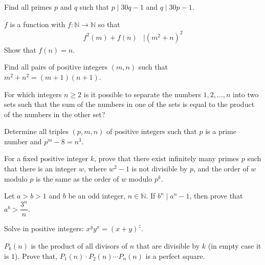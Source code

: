 \begin{problem}
	Find all primes $p$ and $q$ such that $p \mid  30q-1$ and $q \mid  30p-1$.
\end{problem}

\begin{problem}
	$f$ is a function with $f:\mathbb{N}\to\mathbb{N} $ so that
		\begin{align*}
			f^2(m)+f(n) & \mid  (m^2+n)^2
		\end{align*}
	Show that $f(n)=n$.
\end{problem}

\begin{problem}[Columbia $2010$]
	Find all pairs of positive integers $(m,n)$ such that $m^2+n^2=(m+1)(n+1)$.
\end{problem}

\begin{problem}
	For which integers $n\geq2$ is it possible to separate the numbers $1, 2,\ldots, n$ into two sets such that the sum of the numbers in one of the sets is equal to the product of the numbers in the other set?
\end{problem}

\begin{problem}[Greece]
	Determine all triples $(p, m, n)$ of positive integers such that $p$ is a prime number and $p^m-8=n^3$.
\end{problem}

\begin{problem}
	For a fixed positive integer $k$, prove that there exist infinitely many primes $p$ such that there is an integer $w$, where $w^2-1$ is not divisible by $p$, and the order of $w$ modulo $p$ is the same as the order of $w$ modulo $p^k$.
\end{problem}

\begin{problem}
	Let $a>b>1$ and $b$ be an odd integer, $n\in\mathbb{N}$. If $b^n\mid a^n-1$, then prove that $a^b>\dfrac{3^n}{n}$.
\end{problem}

\begin{problem}[Kazakhstan $2015$]
	Solve in positive integers: $x^yy^x = (x+y)^z$.
\end{problem}

\begin{problem}[Kazakhstan $2015$]
	$P_k(n)$ is the product of all divisors of $n$ that are divisible by $k$ (in empty case it is $1$). Prove that, $P_1(n)\cdot P_2(n)\cdots P_n(n)$ is a perfect square.
\end{problem}

